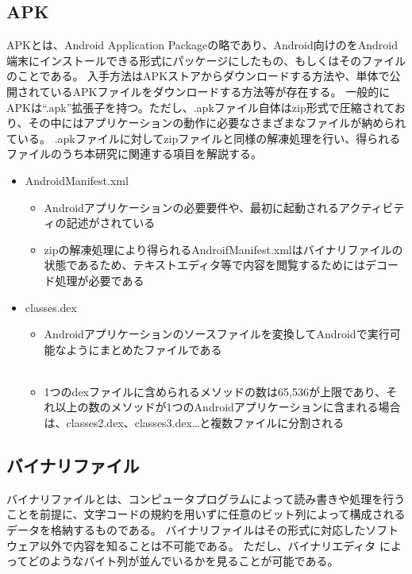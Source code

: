 \subsection{APK}
APKとは、Android Application Packageの略であり、Android向けのをAndroid端末にインストールできる形式にパッケージにしたもの、もしくはそのファイルのことである。
入手方法はAPKストアからダウンロードする方法や、単体で公開されているAPKファイルをダウンロードする方法等が存在する。
一般的にAPKは“.apk”拡張子を持つ。ただし、.apkファイル自体はzip形式で圧縮されており、その中にはアプリケーションの動作に必要なさまざまなファイルが納められている。
.apkファイルに対してzipファイルと同様の解凍処理を行い、得られるファイルのうち本研究に関連する項目を解説する。
\begin{itemize}
	\item  AndroidManifest.xml
		\begin{itemize}
			\item Androidアプリケーションの必要要件や、最初に起動されるアクティビティの記述がされている
			\item zipの解凍処理により得られるAndroifManifest.xmlはバイナリファイルの状態であるため、テキストエディタ等で内容を閲覧するためにはデコード処理が必要である
		\end{itemize}
	\item classes.dex
		\begin{itemize}
			\item Androidアプリケーションのソースファイルを変換してAndroidで実行可能なようにまとめたファイルである
			\item 1つのdexファイルに含められるメソッドの数は65,536が上限であり、それ以上の数のメソッドが1つのAndroidアプリケーションに含まれる場合は、classes2.dex、classes3.dex…と複数ファイルに分割される
		\end{itemize}
\end{itemize}


\subsection{バイナリファイル}
バイナリファイルとは、コンピュータプログラムによって読み書きや処理を行うことを前提に、文字コードの規約を用いずに任意のビット列によって構成されるデータを格納するものである。
バイナリファイルはその形式に対応したソフトウェア以外で内容を知ることは不可能である。
ただし、バイナリエディタ
によってどのようなバイト列が並んでいるかを見ることが可能である。


